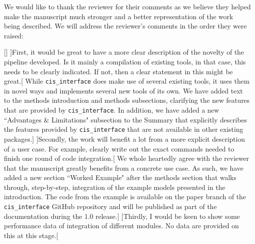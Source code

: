 \documentclass[11pt]{article}
\newcommand{\pkg}{{\tt cis\_interface}{}}
\newcommand{\cmark}{\ding{51}}%
\newcommand{\done}{\makebox[0pt][l]{$\square$}{\raisebox{2pt}{\large\hspace{1pt}\cmark}}%
\hspace{-2.5pt}}
\begin{document}
We would like to thank the reviewer for their comments as we believe they helped make the manuscript much stronger and a better representation of the work being described. We will address the reviewer's comments in the order they were raised:
%
\begin{comments}
[]
\comment[\done]{First, it would be great to have a more clear description of the novelty of the pipeline developed. Is it mainly a compilation of existing tools, in that case, this needs to be clearly indicated. If not, then a clear statement in this might be great.}[%
%
While {\pkg} does make use of several existing tools, it uses them in novel ways and implements several new tools of its own. We have added text to the methods introduction and methods subsections, clarifying the new features that are provided by {\pkg}. In addition, we have added a new ``Advantages \& Limitations" subsection to the Summary that explicitly describes the features provided by {\pkg} that are not available in other existing packages.]
\comment[\done]{Secondly, the work will benefit a lot from a more explicit description of a user case. For example, clearly write out the exact commands needed to finish one round of code integration.}[%
%
We whole heartedly agree with the reviewer that the manuscript greatly benefits from a concrete use case. As such, we have added a new section ``Worked Example" after the methods section that walks through, step-by-step, integration of the example models presented in the introduction. The code from the example is available on the paper branch of the {\pkg} GitHub repository and will be published as part of the documentation during the 1.0 release.]
\comment[\done]{Thirdly, I would be keen to show some performance data of integration of different modules. No data are provided on this at this stage.}[%
%

\end{comments}
\end{document}
